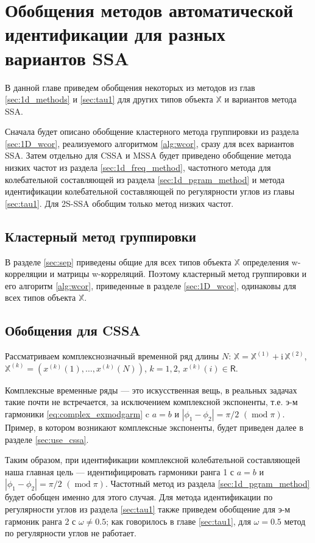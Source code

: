 \documentclass[specialist,
               substylefile = spbu.rtx,
               subf,href,colorlinks=true, 12pt]{disser}
\def\mod{\mathop{\mathrm{mod}}}
\newcommand{\I}{\mathrm{i}}
\begin{document}
\chapter{Обобщения методов автоматической идентификации для разных вариантов SSA}
\label{sec:all_methods}

В данной главе приведем обобщения некоторых из методов из глав \ref{sec:1d_methods} и \ref{sec:tau1} для других типов объекта $\mathbb{X}$ и вариантов метода SSA. 

Сначала будет описано обобщение кластерного метода группировки из раздела \ref{sec:1D_wcor}, реализуемого алгоритмом \ref{alg:wcor}, сразу для всех вариантов SSA.
Затем отдельно для CSSA и MSSA будет приведено обобщение метода низких частот из раздела \ref{sec:1d_freq_method}, частотного метода для колебательной составляющей из раздела \ref{sec:1d_pgram_method} и метода идентификации колебательной составляющей по регулярности углов из главы \ref{sec:tau1}.
Для 2S-SSA обобщим только метод низких частот.

\section{Кластерный метод группировки}
В разделе \ref{sec:sep} приведены общие для всех типов объекта $\mathbb{X}$ определения w-корреляции и матрицы w-корреляций. Поэтому кластерный метод группировки и его алгоритм \ref{alg:wcor}, приведенные в разделе \ref{sec:1D_wcor}, одинаковы для всех типов объекта $\mathbb{X}$.

\section{Обобщения для CSSA}
Рассматриваем комплекснозначный временной ряд длины $N$: $\mathbb{X}=\mathbb{X}^{(1)} + \I \,\mathbb{X}^{(2)}$, $\mathbb{X}^{(k)}= \left(x^{(k)}(1),\ldots,x^{(k)}(N)\right)$, $k=1,2$, $x^{(k)}(i) \in \mathsf{R}$.

Комплексные временные ряды --- это искусственная вещь, в реальных задачах такие почти не встречается, за исключением комплексной экспоненты, т.е. э-м гармоники \eqref{eq:complex_exmodgarm} c $a=b$ и $|\phi_1 - \phi_2| = \pi/2 \,\,(\mod \pi)$. Пример, в котором возникают комплексные экспоненты, будет приведен далее в разделе \ref{sec:use_cssa}.

Таким образом, при идентификации комплексной колебательной составляющей наша главная цель --- идентифицировать гармоники ранга 1 с $a=b$ и $|\phi_1 - \phi_2| = \pi/2 \,\,(\mod \pi)$.
Частотный метод из раздела \ref{sec:1d_pgram_method} будет обобщен именно для этого случая. Для метода идентификации по регулярности углов из раздела \ref{sec:tau1} также приведем обобщение для э-м гармоник ранга 2 с $\omega \not = 0.5$; как говорилось в главе \ref{sec:tau1}, для $\omega=0.5$ метод по регулярности углов не работает. 
\end{document}
